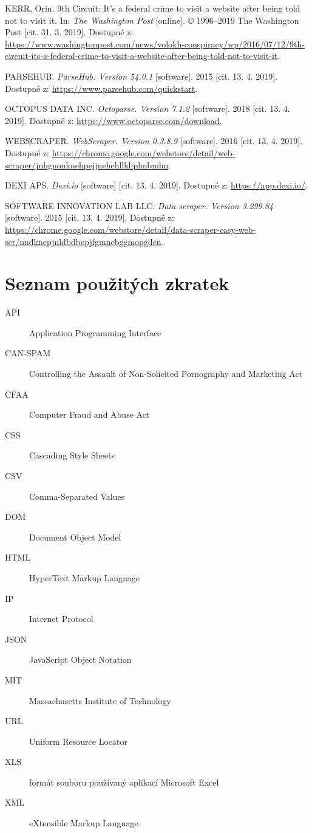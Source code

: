 \documentclass[thesis=B,czech]{FITthesis}[2012/06/26]
\begin{document}
\begin{thebibliography}{99}
	KERR, Orin. 9th Circuit: It’s a federal crime to visit a website after being told not to visit it. In: \textit{The Washington Post} [online]. © 1996--2019 The Washington Post [cit. 31. 3. 2019]. Dostupné z: \url{https://www.washingtonpost.com/news/volokh-conspiracy/wp/2016/07/12/9th-circuit-its-a-federal-crime-to-visit-a-website-after-being-told-not-to-visit-it}.
	
	PARSEHUB. \textit{ParseHub. Version 54.0.1} [software]. 2015 [cit. 13. 4. 2019]. Dostupné z: \url{https://www.parsehub.com/quickstart}.
	
	OCTOPUS DATA INC. \textit{Octoparse. Version 7.1.2} [software]. 2018 [cit. 13. 4. 2019]. Dostupné z: \url{https://www.octoparse.com/download}.
	
	WEBSCRAPER. \textit{WebScraper. Version 0.3.8.9} [software]. 2016 [cit. 13. 4. 2019]. Dostupné z: \url{https://chrome.google.com/webstore/detail/web-scraper/jnhgnonknehpejjnehehllkliplmbmhn}.
	
	DEXI APS. \textit{Dexi.io} [software] [cit. 13. 4. 2019]. Dostupné z: \url{https://app.dexi.io/}.
	
	 SOFTWARE INNOVATION LAB LLC. \textit{Data scraper. Version 3.299.84} [software]. 2015 [cit. 13. 4. 2019]. Dostupné z: \url{https://chrome.google.com/webstore/detail/data-scraper-easy-web-scr/nndknepjnldbdbepjfgmncbggmopgden}.
	
\end{thebibliography}

\appendix




\chapter{Seznam použitých zkratek}
\begin{description}
	\item[API] Application Programming Interface
	\item[CAN-SPAM] Controlling the Assault of Non-Solicited Pornography and Marketing Act
	\item[CFAA] Computer Fraud and Abuse Act
	\item[CSS] Cascading Style Sheets
	\item[CSV] Comma-Separated Values
	\item[DOM] Document Object Model
	\item[HTML] HyperText Markup Language
	\item[IP] Internet Protocol
	\item[JSON] JavaScript Object Notation
	\item[MIT] Massachusetts Institute of Technology
	\item[URL] Uniform Resource Locator
	\item[XLS] formát souboru používaný aplikací Microsoft Excel
	\item[XML] eXtensible Markup Language	
\end{description}
\end{document}

